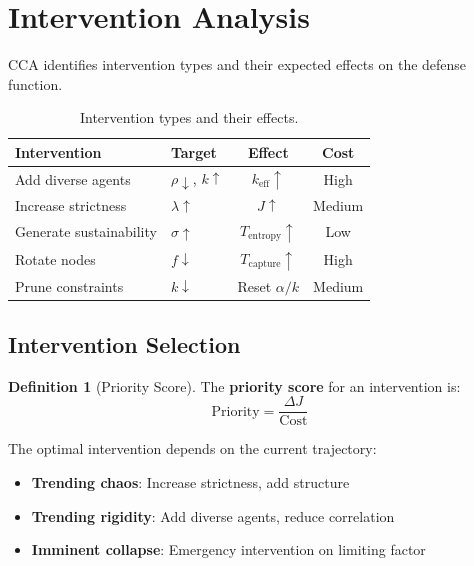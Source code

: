 \documentclass[11pt,a4paper]{article}
\theoremstyle{definition}
\newtheorem{definition}{Definition}[section]
\theoremstyle{remark}
\newcommand{\keff}{k_{\text{eff}}}
\newcommand{\Tentropy}{T_{\text{entropy}}}
\newcommand{\Tcapture}{T_{\text{capture}}}
\begin{document}
\section{Intervention Analysis}

CCA identifies intervention types and their expected effects on the defense function.

\begin{table}[H]
\centering
\begin{tabular}{llcc}
\toprule
\textbf{Intervention} & \textbf{Target} & \textbf{Effect} & \textbf{Cost} \\
\midrule
Add diverse agents & $\rho \downarrow$, $k \uparrow$ & $\keff \uparrow$ & High \\
Increase strictness & $\lambda \uparrow$ & $J \uparrow$ & Medium \\
Generate sustainability & $\sigma \uparrow$ & $\Tentropy \uparrow$ & Low \\
Rotate nodes & $f \downarrow$ & $\Tcapture \uparrow$ & High \\
Prune constraints & $k \downarrow$ & Reset $\alpha/k$ & Medium \\
\bottomrule
\end{tabular}
\caption{Intervention types and their effects.}
\end{table}

\subsection{Intervention Selection}

\begin{definition}[Priority Score]
The \textbf{priority score} for an intervention is:
\begin{equation}
\text{Priority} = \frac{\Delta J}{\text{Cost}}
\end{equation}
\end{definition}

The optimal intervention depends on the current trajectory:
\begin{itemize}
    \item \textbf{Trending chaos}: Increase strictness, add structure
    \item \textbf{Trending rigidity}: Add diverse agents, reduce correlation
    \item \textbf{Imminent collapse}: Emergency intervention on limiting factor
\end{itemize}
\end{document}
